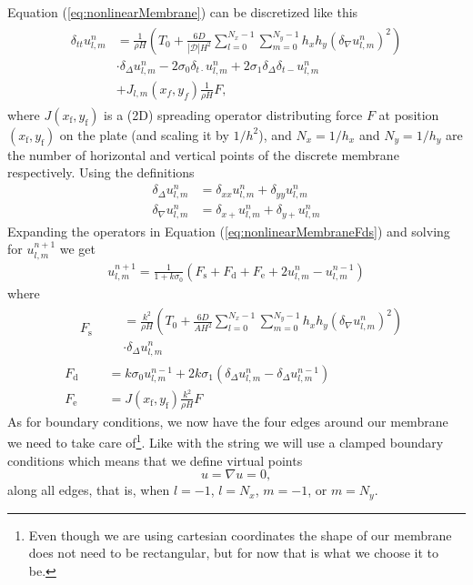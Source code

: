 \documentclass{article}
\begin{document}
Equation (\ref{eq:nonlinearMembrane}) can be discretized like this
\begin{align}
  \label{eq:nonlinearMembraneFds}
  \begin{split}
  \delta_{tt} u^n_{l, m} &= \frac{1}{\rho H} \left(T_0 + \frac{6D}{|\mathcal{D}| H^2} \sum_{l=0}^{N_x-1}\sum_{m=0}^{N_y-1} h_x h_y (\delta_\nabla u^n_{l, m})^2 \right)\\
  &\cdot\delta_\Delta u^n_{l, m}- 2 \sigma_0 \delta_{t\cdot} u^n_{l, m} + 2 \sigma_1 \delta_\Delta \delta_{t-} u^n_{l, m}\\
  &+J_{l,m}(x_f,y_f)\frac{1}{\rho H} F,
  \end{split}
\end{align}
where $J(x_\text{f},y_\text{f})$ is a (2D) spreading operator distributing force $F$ at position $(x_\text{f},y_\text{f})$ on the plate (and scaling it by $1/h^2$), and $N_x = 1/h_x$ and $N_y=1/h_y$ are the number of horizontal and vertical points of the discrete membrane respectively. Using the definitions
\begin{align}
  \delta_\Delta u^n_{l, m} &= \delta_{xx} u^n_{l, m} + \delta_{yy} u^n_{l, m}\\
  \delta_\nabla u^n_{l, m} &= \delta_{x+} u^n_{l, m} + \delta_{y+} u^n_{l, m}
\end{align}
%
Expanding the operators in Equation (\ref{eq:nonlinearMembraneFds}) and solving for $u^{n+1}_{l, m}$ we get 
\begin{align}
  u^{n+1}_{l, m} = \frac{1}{1 + k\sigma_0} (F_\text{s} + F_\text{d} + F_\text{e} + 2 u^n_{l, m} - u^{n-1}_{l, m})
\end{align}
where
\begin{align}
\begin{aligned}
&F_\text{s} \\
&
\end{aligned}
&\begin{aligned}
  &= \frac{k^2}{\rho H} \left(T_0 + \frac{6D}{A H^2} \sum_{l=0}^{N_x-1}\sum_{m=0}^{N_y-1} h_x h_y(\delta_\nabla u^n_{l, m})^2 \right)\\
  &\cdot\delta_\Delta u^n_{l, m} 
  \end{aligned}\\
  F_\text{d} &= k \sigma_0 u^{n-1}_{l, m} + 2 k \sigma_1 (\delta_\Delta u^{n}_{l, m} - \delta_\Delta u^{n-1}_{l, m}) \\
  F_\text{e} &= J(x_\text{f}, y_\text{f})\frac{k^2}{\rho H} F
\end{align}
%
As for boundary conditions, we now have the four edges around our membrane we need to take care of\footnote{Even though we are using cartesian coordinates the shape of our membrane does not need to be rectangular, but for now that is what we choose it to be.}.
Like with the string we will use a clamped boundary conditions which means that we define virtual points
\begin{equation}
  u = \nabla u= 0,
\end{equation}
along all edges, that is, when $l = -1$, $l = N_x$, $m = -1$, or $m = N_y$.
\end{document}
